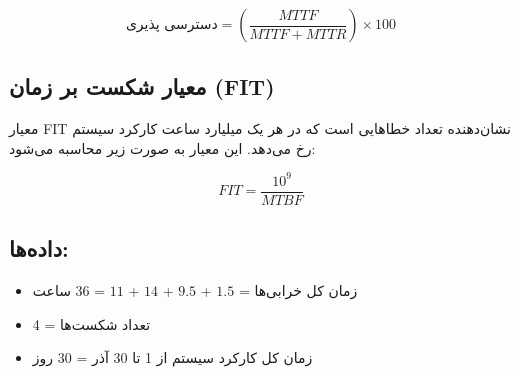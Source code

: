 \begin{equation}
	\text{دسترسی پذیری} = \left( \frac{MTTF}{MTTF + MTTR} \right) \times 100
\end{equation}

\subsection*{معیار شکست بر زمان (FIT)}
معیار FIT نشان‌دهنده تعداد خطاهایی است که در هر یک میلیارد ساعت کارکرد سیستم رخ می‌دهد. این معیار به صورت زیر محاسبه می‌شود:

\begin{equation}
	FIT = \frac{10^9}{MTBF}
\end{equation}

\subsection*{داده‌ها:}
\begin{itemize}
	\item زمان کل خرابی‌ها = $1.5$ + $9.5$ + $14$ + $11$ = $36$ ساعت
	\item تعداد شکست‌ها = 4
	\item زمان کل کارکرد سیستم از 1 تا 30 آذر = 30 روز
\end{itemize}

